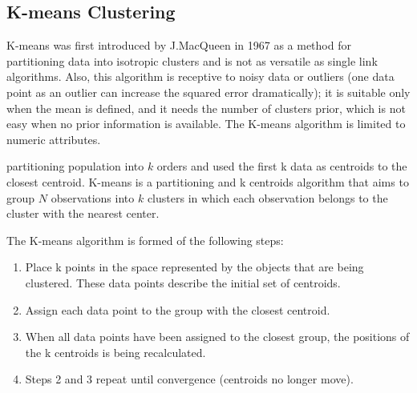 \documentclass[../UNBThesis2.tex]{subfiles}
\begin{document}








\subsection{K-means Clustering} \label{kmeansalgo}

K-means was first introduced by J.MacQueen in 1967 \cite{macqueen} as a method for partitioning data into isotropic clusters and is not as versatile as single link algorithms.
Also, this algorithm is receptive to noisy data or outliers (one data point as an outlier can increase the squared error dramatically); it is suitable only when the mean is defined, and it needs the number of clusters prior, which is not easy when no prior information is available.
The  K-means algorithm is limited to numeric attributes.



partitioning population into $k$ orders and used the first k data as centroids to the closest centroid.
K-means is a partitioning and k centroids algorithm that aims to group $N$ observations into $k$ clusters in which each observation belongs to the cluster with the nearest center.

The K-means algorithm is formed of the following steps:
\begin{enumerate}
    \item Place k points in the space represented by the objects that are being clustered. These data points describe the initial set of centroids.
    \item Assign each data point to the group with the closest centroid.
    \item When all data points have been assigned to the closest group, the positions of the k centroids is being recalculated.
    \item  Steps 2 and 3 repeat until convergence (centroids no longer move).
\end{enumerate}
\end{document}
